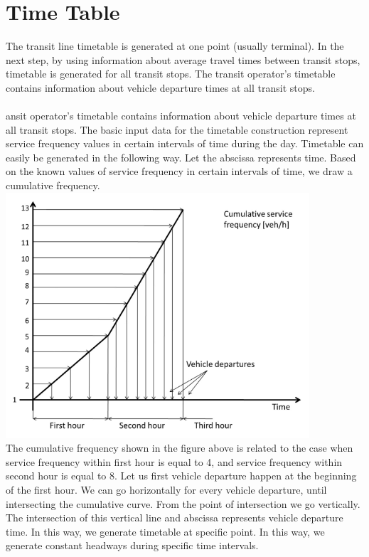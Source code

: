 \section{Time Table}
The transit line timetable is generated at one point (usually terminal). In the next step, by using information about average travel times between transit stops, timetable is generated for all transit stops. The transit operator’s timetable contains information about vehicle departure times at all transit stops.\\\\
ansit operator’s timetable contains information about vehicle departure times at all transit stops. The basic input data for the timetable construction represent service frequency values in certain intervals of time during the day. Timetable can easily be generated in the following way. Let the abscissa represents time. Based on the known values of service frequency in certain intervals of time, we draw a cumulative frequency.\\
\includegraphics{gfx/fig27.png}\\
The cumulative frequency shown in the figure above is related to the case when service frequency within first hour is equal to 4, and service frequency within second hour is equal to 8. Let us first vehicle departure happen at the beginning of the first hour. We can go horizontally for every vehicle departure, until intersecting the cumulative curve. From the point of intersection we go vertically. The intersection of this vertical line and abscissa represents vehicle departure time. In this way, we generate timetable at specific point. In this way, we generate constant headways during specific time intervals.\\\\
